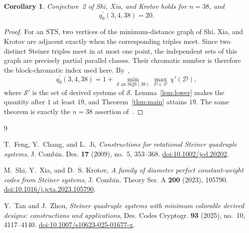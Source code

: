 \documentclass[11pt]{amsart}
\newtheorem{corollary}[theorem]{Corollary}
\newcommand{\STS}{\mathrm{STS}}
\newcommand{\SQS}{\mathrm{SQS}}
\begin{document}
\begin{corollary}\label{cor:q0}
Conjecture~2 of Shi, Xia, and Krotov holds for $n=38$, and
\[
q^{\prime}_{0}(3,4,38)=20.
\]
\end{corollary}

\begin{proof}
For an $\STS$, two vertices of the minimum-distance graph of
Shi, Xia, and Krotov are adjacent exactly when the corresponding
triples meet. Since two distinct Steiner triples meet in at most one
point, the independent sets of this graph are precisely partial
parallel classes. Their chromatic number is therefore the
block-chromatic index used here. By~\cite[Thm.~5]{ShiXiaKrotov},
\[
q^{\prime}_{0}(3,4,38)
=1+\min_{\mathcal S\text{ an }\SQS(38)}
\max_{\mathcal D\in\mathcal S'}\chi'(\mathcal D),
\]
where $\mathcal S'$ is the set of derived systems of $\mathcal S$.
Lemma~\ref{lem:lower} makes the quantity after $1$ at least $19$, and
Theorem~\ref{thm:main} attains $19$. The same theorem is exactly the
$n=38$ assertion of~\cite[Conj.~2]{ShiXiaKrotov}.
\end{proof}

\begin{thebibliography}{9}

T.~Feng, Y.~Chang, and L.~Ji,
\emph{Constructions for rotational Steiner quadruple systems},
J. Combin. Des. \textbf{17} (2009), no.~5, 353--368.
\href{https://doi.org/10.1002/jcd.20202}{doi:10.1002/jcd.20202}.

M.~Shi, Y.~Xia, and D.~S. Krotov,
\emph{A family of diameter perfect constant-weight codes from
Steiner systems},
J. Combin. Theory Ser. A \textbf{200} (2023), 105790.
\href{https://doi.org/10.1016/j.jcta.2023.105790}
{doi:10.1016/j.jcta.2023.105790}.

Y.~Tan and J.~Zhou,
\emph{Steiner quadruple systems with minimum colorable derived designs:
constructions and applications},
Des. Codes Cryptogr. \textbf{93} (2025), no.~10, 4117--4140.
\href{https://doi.org/10.1007/s10623-025-01677-x}
{doi:10.1007/s10623-025-01677-x}.

\end{thebibliography}
\end{document}
